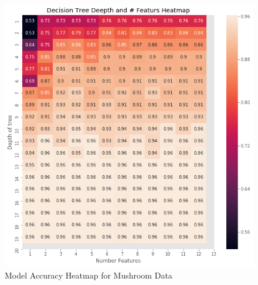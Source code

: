 \documentclass[10pt, conference, compsocconf]{IEEEtran}
\begin{document}
\begin{figure}[h]
	\centering
	\includegraphics[scale = 0.28]{image/DTheatMap_mushroom.png}
	\caption{Model Accuracy Heatmap for Mushroom Data}
	\label{fig:mush_heat}
\end{figure}
\end{document}
